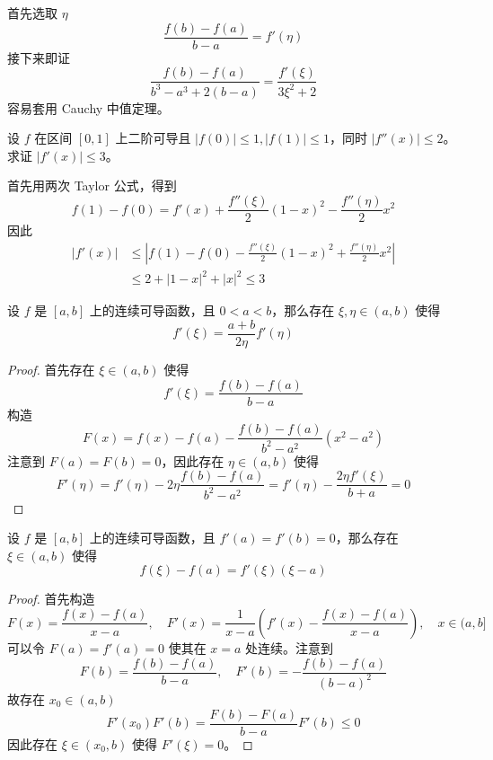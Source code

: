 \begin{solution}
	首先选取 $\eta$
	\[ \frac{f(b) - f(a)}{b - a} = f'(\eta) \]
	接下来即证
	\[ \frac{f(b) - f(a)}{b^3 - a^3 + 2(b - a)} = \frac{f'(\xi)}{3\xi^2 + 2} \]
	容易套用 Cauchy 中值定理。
\end{solution}

\begin{problem}[000039]
设 $f$ 在区间 $[0, 1]$ 上二阶可导且 $|f(0)| \leqslant 1, |f(1)| \leqslant 1$，同时 $|f''(x)| \leqslant 2$。求证 $|f'(x)| \leqslant 3$。
\end{problem}

\begin{solution}
	首先用两次 Taylor 公式，得到
	\[ f(1) - f(0) = f'(x) + \frac{f''(\xi)}{2}(1 - x)^2 - \frac{f''(\eta)}{2}x^2 \]
	因此
	\[ \begin{aligned}
			|f'(x)| & \leqslant \left| f(1) - f(0) - \frac{f''(\xi)}{2}(1 - x)^2 + \frac{f''(\eta)}{2}x^2 \right| \\
			        & \leqslant 2 + |1-x|^2 + |x|^2 \leqslant 3
		\end{aligned} \]
\end{solution}

\begin{problem}[000040]
设 $f$ 是 $[a,b]$ 上的连续可导函数，且 $0 < a < b$，那么存在 $\xi, \eta \in (a,b)$ 使得
\[ f'(\xi) = \frac{a+b}{2\eta}f'(\eta) \]
\end{problem}

\begin{proof}
	首先存在 $\xi \in (a,b)$ 使得
	\[ f'(\xi) = \frac{f(b) - f(a)}{b - a} \]
	构造
	\[ F(x) = f(x) - f(a) - \frac{f(b) - f(a)}{b^2 - a^2}(x^2 - a^2) \]
	注意到 $F(a) = F(b) = 0$，因此存在 $\eta \in (a, b)$ 使得
	\[ F'(\eta) = f'(\eta) - 2 \eta \frac{f(b) - f(a)}{b^2 - a^2} = f'(\eta) - \frac{2 \eta f'(\xi)}{b + a} = 0 \]
\end{proof}

\begin{problem}[000041]
设 $f$ 是 $[a,b]$ 上的连续可导函数，且 $f'(a) = f'(b) = 0$，那么存在 $\xi \in (a,b)$ 使得
\[ f(\xi) - f(a) = f'(\xi)(\xi - a) \]
\end{problem}

\begin{proof}
	首先构造
	\[ F(x) = \frac{f(x) - f(a)}{x - a}, \quad F'(x) = \frac{1}{x-a} \left(f'(x) - \frac{f(x) - f(a)}{x-a}\right), \quad x \in (a, b] \]
	可以令 $F(a) = f'(a) = 0$ 使其在 $x=a$ 处连续。注意到
	\[ F(b) = \frac{f(b) - f(a)}{b-a}, \quad F'(b) = -\frac{f(b) - f(a)}{(b-a)^2} \]
	故存在 $x_0 \in (a, b)$
	\[ F'(x_0) F'(b) = \frac{F(b) - F(a)}{b - a} F'(b) \leqslant 0 \]
	因此存在 $\xi \in (x_0, b)$ 使得 $F'(\xi) = 0$。
\end{proof}

